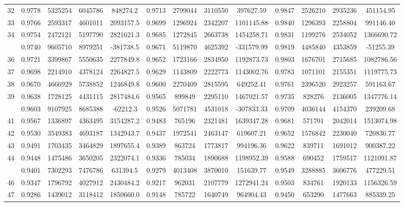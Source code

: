 \documentclass[
  12pt,
]{article}
\begin{document}
\begin{longtable}[t]{lcccccccccccc}
32 & 0.9778 & 5325254 & 6045786 & 848274.2 & 0.9713 & 2799044 & 3110550 & 397627.59 & 0.9847 & 2526210 & 2935236 & 451154.95\\
33 & 0.9766 & 2593317 & 4601011 & 2093157.5 & 0.9699 & 1296924 & 2342207 & 1101145.88 & 0.9840 & 1296393 & 2258804 & 991146.40\\
34 & 0.9754 & 2472121 & 5197790 & 2821621.3 & 0.9685 & 1272845 & 2663738 & 1454258.71 & 0.9831 & 1199276 & 2534052 & 1366690.72\\
\addlinespace
35 & 0.9740 & 9605710 & 8979251 & -381738.5 & 0.9671 & 5119870 & 4625392 & -331579.99 & 0.9819 & 4485840 & 4353859 & -51255.39\\
36 & 0.9721 & 3399867 & 5550635 & 2277849.8 & 0.9652 & 1723166 & 2834950 & 1192873.73 & 0.9803 & 1676701 & 2715685 & 1082786.56\\
37 & 0.9698 & 2214910 & 4378124 & 2264827.5 & 0.9629 & 1143809 & 2222773 & 1143002.76 & 0.9783 & 1071101 & 2155351 & 1119775.73\\
38 & 0.9670 & 4666929 & 5738852 & 1246849.8 & 0.9600 & 2270409 & 2815595 & 649252.41 & 0.9761 & 2396520 & 2923257 & 591163.67\\
39 & 0.9638 & 1728125 & 4431115 & 2817484.6 & 0.9565 & 899849 & 2295110 & 1467021.57 & 0.9735 & 828276 & 2136005 & 1347776.14\\
\addlinespace
40 & 0.9603 & 9107925 & 8685388 & -62212.3 & 0.9526 & 5071781 & 4531018 & -307833.33 & 0.9709 & 4036144 & 4154370 & 239209.68\\
41 & 0.9567 & 1336897 & 4363495 & 3154287.2 & 0.9483 & 765196 & 2321481 & 1639347.28 & 0.9681 & 571701 & 2042014 & 1513074.98\\
42 & 0.9530 & 3549383 & 4693187 & 1342943.7 & 0.9437 & 1972541 & 2463147 & 619607.21 & 0.9652 & 1576842 & 2230040 & 720836.77\\
43 & 0.9491 & 1703435 & 3464829 & 1897655.4 & 0.9389 & 863724 & 1773817 & 994196.36 & 0.9622 & 839711 & 1691012 & 900387.22\\
44 & 0.9448 & 1475486 & 3650205 & 2322074.1 & 0.9336 & 785034 & 1890688 & 1198952.39 & 0.9588 & 690452 & 1759517 & 1121091.87\\
\addlinespace
45 & 0.9401 & 7302293 & 7476786 & 631394.5 & 0.9279 & 4013408 & 3870010 & 151639.77 & 0.9549 & 3288885 & 3606776 & 477229.51\\
46 & 0.9347 & 1796792 & 4027912 & 2430484.2 & 0.9217 & 962031 & 2107779 & 1272941.24 & 0.9503 & 834761 & 1920133 & 1156326.59\\
47 & 0.9286 & 1439012 & 3118412 & 1850660.0 & 0.9148 & 785722 & 1640749 & 964904.43 & 0.9450 & 653290 & 1477663 & 885339.25\\

\end{longtable}
\end{document}
